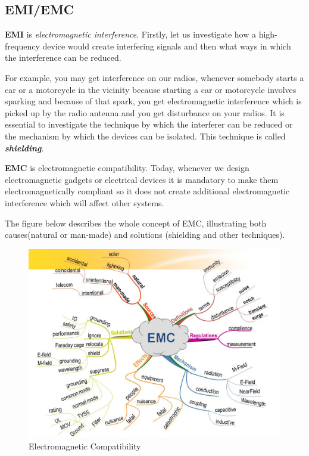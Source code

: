 \subsection{EMI/EMC}

\textbf{EMI} is \textit{electromagnetic interference}. Firstly, let us investigate how a high-frequency device would create interfering signals and then what ways in which the interference can be reduced.

For example, you may get interference on our radios, whenever somebody starts a car or a motorcycle in the vicinity because starting a car or motorcycle involves sparking and because of that spark, you get electromagnetic interference which is picked up by the radio antenna and you get disturbance on your radios. It is essential to investigate the technique by which the interferer can be reduced or the mechanism by which the devices can be isolated. This technique is called \textit{\textbf{shielding}}.

\textbf{EMC} is electromagnetic compatibility. Today, whenever we design electromagnetic gadgets or electrical devices it is mandatory to make them electromagnetically compliant so it does not create additional electromagnetic interference which will affect other systems.

The figure below describes the whole concept of EMC, illustrating both causes(natural or man-made) and solutions (shielding and other techniques).

\begin{figure}[h]
\centering
\includegraphics[scale=0.35]{./graphics/634771461726914062}
\caption{Electromagnetic Compatibility}
\label{fig:634771461726914062}
\end{figure}

